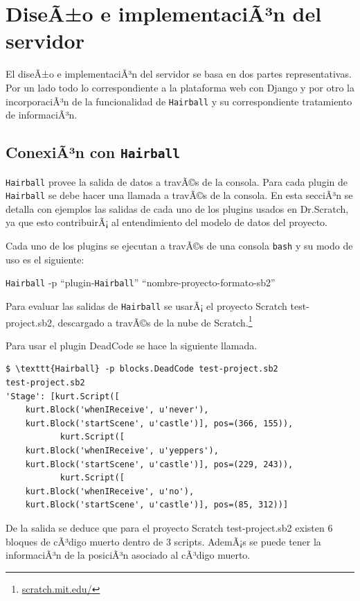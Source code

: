 \documentclass[a4paper, 12pt]{book}
\begin{document}
\section{DiseÃ±o e implementaciÃ³n del servidor}
\label{sec:servidor}

El diseÃ±o e implementaciÃ³n del servidor se basa en dos partes representativas. Por un lado todo lo
correspondiente a la plataforma web con Django y por otro la incorporaciÃ³n de la funcionalidad de
\texttt{Hairball} y su correspondiente tratamiento de informaciÃ³n.

\subsection{ConexiÃ³n con \texttt{Hairball}}

\texttt{Hairball} provee la salida de datos a travÃ©s de la consola. Para cada plugin de \texttt{Hairball} se debe hacer una llamada
a travÃ©s de la consola. En esta secciÃ³n se detalla con ejemplos las salidas de cada uno de los plugins usados en
Dr.Scratch, ya que esto contribuirÃ¡ al entendimiento del modelo de datos del proyecto.

Cada uno de los plugins se ejecutan a travÃ©s de una consola \texttt{bash} y su modo de uso es el siguiente:

\begin{center}
\texttt{Hairball} -p "`plugin-\texttt{Hairball}"' "`nombre-proyecto-formato-sb2"'
\end{center}

Para evaluar las salidas de \texttt{Hairball} se usarÃ¡ el proyecto Scratch test-project.sb2, descargado a travÃ©s de la 
nube de Scratch.\footnote{\url{scratch.mit.edu/}}

Para usar el plugin DeadCode se hace la siguiente llamada.
\begingroup
\fontsize{7pt}{8pt}\selectfont
\begin{verbatim}
$ \texttt{Hairball} -p blocks.DeadCode test-project.sb2 
test-project.sb2 
'Stage': [kurt.Script([ 
    kurt.Block('whenIReceive', u'never'), 
    kurt.Block('startScene', u'castle')], pos=(366, 155)), 
           kurt.Script([  
    kurt.Block('whenIReceive', u'yeppers'), 
    kurt.Block('startScene', u'castle')], pos=(229, 243)), 
           kurt.Script([ 
    kurt.Block('whenIReceive', u'no'), 
    kurt.Block('startScene', u'castle')], pos=(85, 312))] 
\end{verbatim}
\endgroup


De la salida se deduce que para el proyecto Scratch test-project.sb2 existen 6 bloques de cÃ³digo muerto dentro de 3 scripts. AdemÃ¡s se puede tener la informaciÃ³n de la posiciÃ³n asociado al cÃ³digo muerto.
\end{document}
